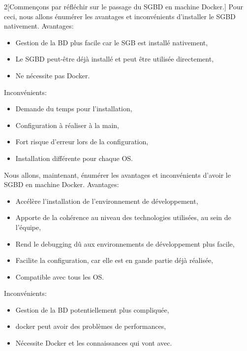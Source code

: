 \documentclass[
    iai, %
    il, %
]{heig-tb}
\begin{document}
\begin{multicols}{2}[Commençons par réfléchir sur le passage du SGBD en machine Docker.]
    Pour ceci, nous allons énumérer les avantages et inconvénients d'installer le SGBD nativement.
    Avantages:
    \begin{itemize}
        \item Gestion de la BD plus facile car le SGB est installé nativement,
        \item Le SGBD peut-être déjà installé et peut être utilisée directement,
        \item Ne nécessite pas Docker.
    \end{itemize}

    Inconvénients:
    \begin{itemize}
        \item Demande du temps pour l'installation,
        \item Configuration à réaliser à la main,
        \item Fort risque d'erreur lors de la configuration,
        \item Installation différente pour chaque OS.
    \end{itemize}

    \columnbreak
    Nous allons, maintenant, énumérer les avantages et inconvénients d'avoir le SGBD en machine Docker.
    Avantages:
    \begin{itemize}
        \item Accélère l'installation de l'environnement de développement, \cite{labrecque,data-flair-pros-cons}
        \item Apporte de la cohérence au niveau des technologies utilisées, au sein de l'équipe, \cite{labrecque, data-flair-use-cases}
        \item Rend le debugging dû aux environnements de développement plus facile, \cite{labrecque,koukia}
        \item Facilite la configuration, car elle est en gande partie déjà réalisée, \cite{data-flair-pros-cons}
        \item Compatible avec tous les OS.
    \end{itemize}

    Inconvénients:
    \begin{itemize}
        \item Gestion de la BD potentiellement plus compliquée,
        \item \Gls{docker} peut avoir des problèmes de performances, \cite{labrecque}
        \item Nécessite Docker et les connaissances qui vont avec. \cite{labrecque}
    \end{itemize}
\end{multicols}
\end{document}

